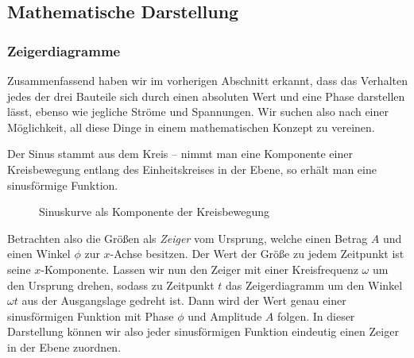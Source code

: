 \subsection{Mathematische Darstellung}
\subsubsection{Zeigerdiagramme}
Zusammenfassend haben wir im vorherigen Abschnitt erkannt, dass das Verhalten jedes der drei Bauteile sich durch einen
absoluten Wert und eine Phase darstellen lässt, ebenso wie jegliche Ströme und Spannungen. Wir suchen also nach einer
Möglichkeit, all diese Dinge in einem mathematischen Konzept zu vereinen.

Der Sinus stammt aus dem Kreis -- nimmt man eine Komponente einer Kreisbewegung entlang des Einheitskreises in der
Ebene, so erhält man eine sinusförmige Funktion.
\begin{figure}[H]
    \centering
    \caption{Sinuskurve als Komponente der Kreisbewegung}
\end{figure}
Betrachten also die Größen als \emph{Zeiger} vom Ursprung, welche einen Betrag $A$ und einen Winkel $\phi$ zur $x$-Achse
besitzen.  Der Wert der Größe zu jedem Zeitpunkt ist seine $x$-Komponente. Lassen wir nun den Zeiger mit einer
Kreisfrequenz $\omega$ um den Ursprung drehen, sodass zu Zeitpunkt $t$ das Zeigerdiagramm um den Winkel $\omega t$ aus
der Ausgangslage gedreht ist. Dann wird der Wert genau einer sinusförmigen Funktion mit Phase $\phi$
und Amplitude $A$ folgen. In dieser Darstellung können wir also jeder sinusförmigen Funktion eindeutig einen Zeiger in
der Ebene zuordnen.

